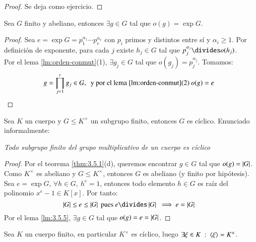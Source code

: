 \begin{proof}
    Se deja como ejercicio.
\end{proof}

\begin{lm}\label{lm:3.5.5}
    Sea $G$ finito y abeliano, entonces $\exists g \in G$ tal que $o(g) = \exp{G}$.
\end{lm}
\begin{proof}
    Sea $e = \exp{G} = p_1^{\alpha_1} \cdots p_r^{\alpha_r}$ con $p_i$ primos y distintos entre sí y $\alpha_i \geq 1$. Por definición de exponente, para cada $j$ existe $h_j \in G$ tal que $p_j^{\alpha_j} \divides o(h_j)$.\\
    Por el lema \ref{lm:orden-conmut}(1), $\exists g_j \in G$ tal que $o(g_j) = p_j^{\alpha_j}$. Tomamos:
    $$
        g = \prod_{j=1}^r g_j \in G,\ \text{ y por el lema \ref{lm:orden-conmut}(2) } o(g) = e
    $$
\end{proof}

\begin{thm}\label{thm:3.5.6}
    Sea $K$ un cuerpo y $G \leq K^\times$ un subgrupo finito, entonces $G$ es cíclico. Enunciado informalmente:\\
    \begin{center}
        \textit{Todo subgrupo finito del grupo multiplicativo de un cuerpo es cíclico}
    \end{center}
\end{thm}

\begin{proof}
    Por el teorema \ref{thm:3.5.1}(d), queremos encontrar $g \in G$ tal que $o(g) = \left|G\right|$.\\
    Como $K^\times$ es abeliano y $G \leq K^\times$, entonces $G$ es abeliano (y finito por hipótesis). Sea $e = \exp G$, $\forall h \in G,\ h^e = 1$, entonces todo elemento $h \in G$ es raíz del polinomio $x^e - 1 \in K[x]$. Por tanto:
    $$
        \vabs{G} \leq e \leq \vabs{G} \text{ pues $e \divides \vabs{G}$ } \implies e = \vabs{G}
    $$
    Por el lema \ref{lm:3.5.5}, $\exists g \in G$ tal que $o(g) = e = \left|G\right|$.
\end{proof}

\begin{obs}
    Sea $K$ un cuerpo finito, en particular $K^\times$ es cíclico, luego $\exists \xi \in K\ :\ \gen{\xi} = K^\times$.
\end{obs}

